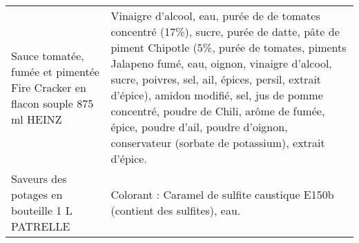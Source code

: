 \begin{longtable}{p{5cm}p{10cm}}
                              Sauce tomatée, fumée et pimentée Fire Cracker en flacon souple 875 ml HEINZ &                                                                                                                                                                                                                                                                                                                                                                                                                                                                                                                                                                                                          Vinaigre d'alcool, eau, purée de de tomates concentré (17\%), sucre, purée de datte, pâte de piment Chipotle (5\%, purée de tomates, piments Jalapeno fumé, eau, oignon, vinaigre d'alcool, sucre, poivres, sel, ail, épices, persil, extrait d'épice), amidon modifié, sel, jus de pomme concentré, poudre de Chili, arôme de fumée, épice, poudre d'ail, poudre d'oignon, conservateur (sorbate de potassium), extrait d'épice. \\
                                                            Saveurs des potages en bouteille 1 L PATRELLE &                                                                                                                                                                                                                                                                                                                                                                                                                                                                                                                                                                                                                                                                                                                                                                                                                                                                                                                                                              Colorant : Caramel de sulfite caustique E150b (contient des sulfites), eau. \\

\end{longtable}
